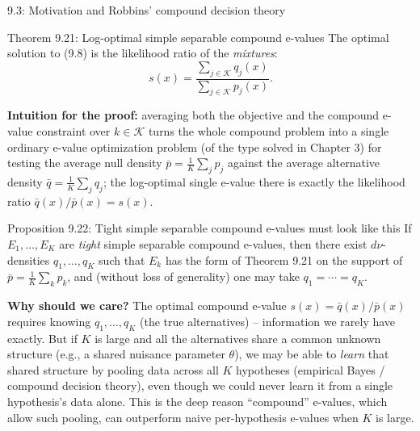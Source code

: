 \documentclass[aspectratio=169,10pt]{beamer}
\newcommand{\Kc}{\mathcal{K}}
\begin{document}
\begin{frame}[allowframebreaks]{9.3: Motivation and Robbins' compound decision theory}
\begin{block}{Theorem 9.21: Log-optimal simple separable compound e-values}
The optimal solution to (9.8) is the likelihood ratio of the \emph{mixtures}:
\[
s(x) = \frac{\sum_{j\in\Kc} q_j(x)}{\sum_{j\in\Kc} p_j(x)}.
\]
\end{block}
\textbf{Intuition for the proof:} averaging both the objective and the compound e-value constraint over $k\in\Kc$ turns the whole compound problem into a single ordinary e-value optimization problem (of the type solved in Chapter 3) for testing the average null density $\bar p = \frac1K\sum_j p_j$ against the average alternative density $\bar q = \frac1K\sum_j q_j$; the log-optimal single e-value there is exactly the likelihood ratio $\bar q(x)/\bar p(x) = s(x)$.

\framebreak

\begin{block}{Proposition 9.22: Tight simple separable compound e-values must look like this}
If $E_1,\dots,E_K$ are \emph{tight} simple separable compound e-values, then there exist $d\nu$-densities $q_1,\dots,q_K$ such that $E_k$ has the form of Theorem 9.21 on the support of $\bar p=\frac1K\sum_k p_k$, and (without loss of generality) one may take $q_1=\cdots=q_K$.
\end{block}

\textbf{Why should we care?} The optimal compound e-value $s(x)=\bar q(x)/\bar p(x)$ requires knowing $q_1,\dots,q_K$ (the true alternatives) -- information we rarely have exactly. But if $K$ is large and all the alternatives share a common unknown structure (e.g., a shared nuisance parameter $\theta$), we may be able to \emph{learn} that shared structure by pooling data across all $K$ hypotheses (empirical Bayes / compound decision theory), even though we could never learn it from a single hypothesis's data alone. This is the deep reason ``compound'' e-values, which allow such pooling, can outperform naive per-hypothesis e-values when $K$ is large.

\end{frame}
\end{document}
